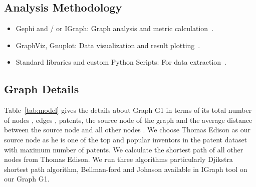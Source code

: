 \subsection{Analysis Methodology}

\begin{itemize}
\squish
\item Gephi and / or IGraph: Graph analysis and metric calculation~\cite{gephi, igraph}.

\item GraphViz, Gnuplot: Data visualization and result plotting~\cite{graphviz, gnuplot}.

\item Standard libraries and custom Python Scripts: For data extraction~\cite{python}.
\end{itemize}

\subsection{Graph Details}
Table~\ref{tab:model} gives the details about Graph G1 in terms of its total
number of nodes , edges , patents, the source node  of the graph and the
average distance between the source node and all other nodes .    We choose
Thomas Edison as our source node as he is one of the top and popular inventors
in the patent dataset with maximum number of patents. We calculate the
shortest path of all other nodes from Thomas Edison.  We run three algorithms
particularly Djikstra shortest path algorithm, Bellman-ford and Johnson
available in IGraph tool on our Graph G1.


